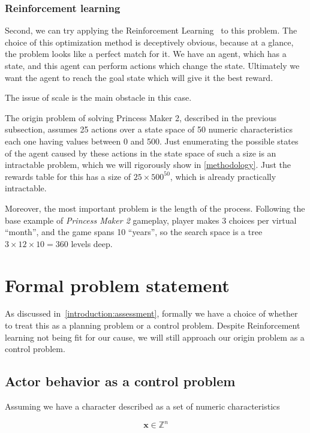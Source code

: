 \documentclass[11pt, a4paper]{article}
\begin{document}
  \subsubsection{Reinforcement learning}
	Second, we can try applying the Reinforcement Learning~\cite{sutton2018reinforcement} to this problem.
	The choice of this optimization method is deceptively obvious, because at a glance, the problem looks like a perfect match for it.
	We have an agent, which has a state, and this agent can perform actions which change the state.
	Ultimately we want the agent to reach the goal state which will give it the best reward.
	
	The issue of scale is the main obstacle in this case.

	The origin problem of solving Princess Maker 2, described in the previous subsection,  assumes 25 actions over a state space of 50 numeric characteristics each one having values between 0 and 500.
	Just enumerating the possible states of the agent caused by these actions in the state space of such a size is an intractable problem, which we will rigorously show in \ref{methodology}.
	Just the rewards table for this has a size of $25 \times 500^{50}$, which is already practically intractable.
	
	Moreover, the most important problem is the length of the process.
	Following the base example of \textit{Princess Maker 2} gameplay, player makes 3 choices per virtual ``month'', and the game spans 10 ``years'', so the search space is a tree $3 \times 12 \times 10 = 360$ levels deep.
	
	\section{Formal problem statement}\label{problem-statement}

	As discussed in~\ref{introduction:assessment}, formally we have a choice of whether to treat this as a planning problem or a control problem.
	Despite Reinforcement learning not being fit for our cause, we will still approach our origin problem as a control problem.

	\subsection{Actor behavior as a control problem}

	Assuming we have a character described as a set of numeric characteristics
	
	\begin{equation}
		\mathbf{x} \in \mathbb{Z}^n
	\end{equation}
	
\end{document}
